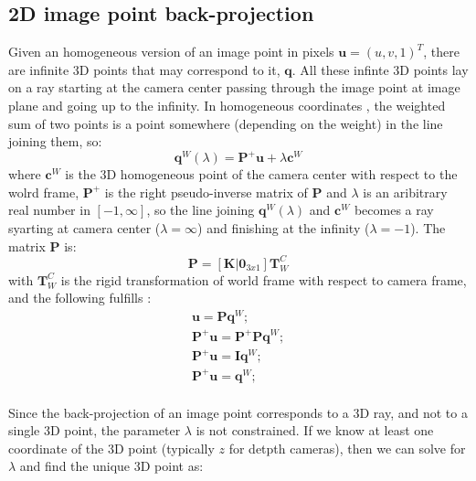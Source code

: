 \subsection{2D image point back-projection}
Given an homogeneous version of an image point in pixels $\mathbf{u}=(u,v,1)^T$, there are infinite 3D points that may correspond to it, $\mathbf{q}$. All these infinte 3D points lay on a ray starting at the camera center passing through the image point at image plane and going up to the infinity. In homogeneous coordinates , the weighted sum of two points is a point somewhere (depending on the weight) in the line joining them, so: 
\begin{equation}
\label{eq:back_projection}
\mathbf{q}^W(\lambda) = \mathbf{P}^{+}\mathbf{u} + \lambda \mathbf{c}^W
\end{equation}
where $\mathbf{c}^W$ is the 3D homogeneous point of the camera center with respect to the wolrd frame, $\mathbf{P}^{+}$ is the right pseudo-inverse matrix of $\mathbf{P}$ and $\lambda$ is an aribitrary real number in $[-1,\infty]$, so the line joining $\mathbf{q}^W(\lambda)$ and $\mathbf{c}^W$ becomes a ray syarting at camera center ($\lambda = \infty$) and finishing at the infinity ($\lambda=-1$). The matrix $\mathbf{P}$ is: 
\begin{equation}
\label{eq:matrix_P}
 \mathbf{P} = \left[\mathbf{K} \vert \mathbf{0}_{3x1} \right] \mathbf{T}^C_W
\end{equation}
with $\mathbf{T}^C_W$ is the rigid transformation of world frame with respect to camera frame, and the following fulfills : 
\begin{equation}
\label{eq:matrix_P_Pinv}
\begin{array}{c}
 \mathbf{u} = \mathbf{P} \mathbf{q}^W; \\ 
 \mathbf{P}^+\mathbf{u} = \mathbf{P}^+\mathbf{P} \mathbf{q}^W;\\
 \mathbf{P}^+\mathbf{u} = \mathbf{I} \mathbf{q}^W;\\
 \mathbf{P}^+\mathbf{u} = \mathbf{q}^W;\\
 \end{array}
\end{equation}

Since the back-projection of an image point corresponds to a 3D ray, and not to a single 3D point, the parameter $\lambda$ is not constrained. If we know at least one coordinate of the 3D point (typically $z$ for detpth cameras), then we can solve for $\lambda$ and find the unique 3D point as: 







